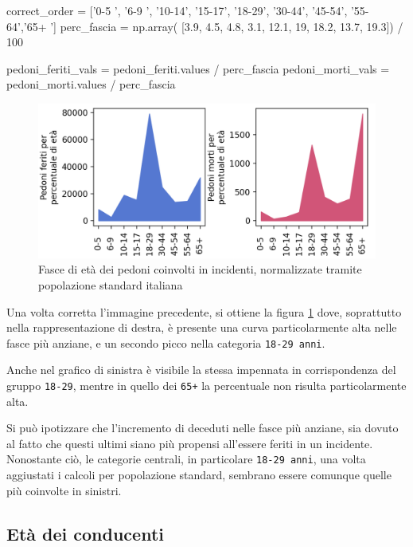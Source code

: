 \documentclass[a4paper]{report}
\newcommand{\columnstyle}[1]{\texttt{#1}}
\begin{document}
\begin{code}
correct_order = ['0-5  ', '6-9  ', '10-14', '15-17', '18-29', '30-44', '45-54', '55-64','65+  ']
perc_fascia = np.array( [3.9, 4.5, 4.8, 3.1, 12.1, 19, 18.2, 13.7, 19.3]) / 100

pedoni_feriti_vals = pedoni_feriti.values / perc_fascia
pedoni_morti_vals = pedoni_morti.values / perc_fascia
\end{code}

\begin{figure}
    \includegraphics[width=\linewidth]{../src/incidenti/incidenti_senza_coords/pedoni/eta_pedoni_norm.png}
    \caption{Fasce di età dei pedoni coinvolti in incidenti, normalizzate 
    tramite popolazione standard italiana}
    \label{fig:eta-pedoni-norm}
\end{figure}

Una volta corretta l'immagine precedente, si ottiene la figura \ref{fig:eta-pedoni-norm} 
dove, soprattutto nella rappresentazione di destra, è presente una curva particolarmente alta 
nelle fasce più anziane, e un secondo picco nella categoria \columnstyle{18-29 anni}. 

Anche nel grafico di sinistra è visibile la stessa impennata in corrispondenza 
del gruppo \columnstyle{18-29}, mentre in quello dei \columnstyle{65+} la 
percentuale non risulta particolarmente alta. 

Si può ipotizzare che l'incremento di deceduti nelle fasce più anziane, sia dovuto al 
fatto che questi ultimi siano più propensi all'essere feriti in un incidente. 
Nonostante ciò, le categorie centrali, in particolare \columnstyle{18-29 anni}, 
una volta aggiustati i calcoli per popolazione standard, sembrano essere comunque 
quelle più coinvolte in sinistri. 

\subsection{Età dei conducenti}
\end{document}
